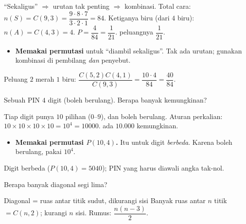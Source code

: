 \jawab
{} ``Sekaligus'' $\Rightarrow$ urutan tak penting $\Rightarrow$
kombinasi. Total cara: $n(S)=C(9,3)=\dfrac{9\cdot8\cdot7}{3\cdot2\cdot1}=84$.
 Ketiganya biru (dari $4$ biru): $n(A)=C(4,3)=4$.
 $P=\dfrac{4}{84}=\dfrac{1}{21}$.
\jadi peluangnya $\dfrac{1}{21}$.

\begin{jebakan}
\begin{itemize}[leftmargin=*,topsep=2pt]
  \item \textbf{Memakai permutasi} untuk ``diambil sekaligus''. Tak ada urutan;
  gunakan kombinasi di pembilang \emph{dan} penyebut.
\end{itemize}
\end{jebakan}

\begin{variasi}
Peluang $2$ merah $1$ biru: $\dfrac{C(5,2)C(4,1)}{C(9,3)}=\dfrac{10\cdot4}{84}
=\dfrac{40}{84}$.
\end{variasi}

\begin{soalbox}{}
Sebuah PIN $4$ digit (boleh berulang). Berapa banyak kemungkinan?
\end{soalbox}

\jawab
{} Tiap digit punya $10$ pilihan ($0$--$9$), dan boleh berulang.
 Aturan perkalian: $10\times10\times10\times10=10^4=10000$.
\jadi ada $10.000$ kemungkinan.

\begin{jebakan}
\begin{itemize}[leftmargin=*,topsep=2pt]
  \item \textbf{Memakai permutasi $P(10,4)$.} Itu untuk digit \emph{berbeda}.
  Karena boleh berulang, pakai $10^4$.
\end{itemize}
\end{jebakan}

\begin{variasi}
Digit berbeda ($P(10,4)=5040$); PIN yang harus diawali angka tak-nol.
\end{variasi}

\begin{soalbox}{}
Berapa banyak diagonal segi lima?
\end{soalbox}

\begin{ingat}{Diagonal = ruas antar titik sudut, dikurangi sisi}
Banyak ruas antar $n$ titik $=C(n,2)$; kurangi $n$ sisi. Rumus:
$\dfrac{n(n-3)}{2}$.
\end{ingat}

